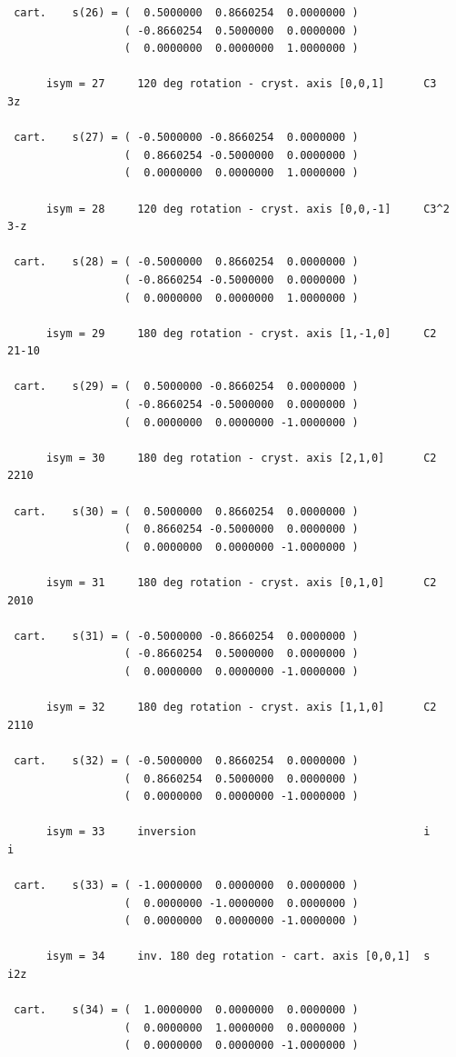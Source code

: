 \documentclass[12pt,a4paper]{article}
\begin{document}
\begin{verbatim}
 cart.    s(26) = (  0.5000000  0.8660254  0.0000000 )
                  ( -0.8660254  0.5000000  0.0000000 )
                  (  0.0000000  0.0000000  1.0000000 )

      isym = 27     120 deg rotation - cryst. axis [0,0,1]      C3     3z

 cart.    s(27) = ( -0.5000000 -0.8660254  0.0000000 )
                  (  0.8660254 -0.5000000  0.0000000 )
                  (  0.0000000  0.0000000  1.0000000 )

      isym = 28     120 deg rotation - cryst. axis [0,0,-1]     C3^2   3-z

 cart.    s(28) = ( -0.5000000  0.8660254  0.0000000 )
                  ( -0.8660254 -0.5000000  0.0000000 )
                  (  0.0000000  0.0000000  1.0000000 )

      isym = 29     180 deg rotation - cryst. axis [1,-1,0]     C2     21-10

 cart.    s(29) = (  0.5000000 -0.8660254  0.0000000 )
                  ( -0.8660254 -0.5000000  0.0000000 )
                  (  0.0000000  0.0000000 -1.0000000 )

      isym = 30     180 deg rotation - cryst. axis [2,1,0]      C2     2210

 cart.    s(30) = (  0.5000000  0.8660254  0.0000000 )
                  (  0.8660254 -0.5000000  0.0000000 )
                  (  0.0000000  0.0000000 -1.0000000 )

      isym = 31     180 deg rotation - cryst. axis [0,1,0]      C2     2010

 cart.    s(31) = ( -0.5000000 -0.8660254  0.0000000 )
                  ( -0.8660254  0.5000000  0.0000000 )
                  (  0.0000000  0.0000000 -1.0000000 )

      isym = 32     180 deg rotation - cryst. axis [1,1,0]      C2     2110

 cart.    s(32) = ( -0.5000000  0.8660254  0.0000000 )
                  (  0.8660254  0.5000000  0.0000000 )
                  (  0.0000000  0.0000000 -1.0000000 )

      isym = 33     inversion                                   i      i

 cart.    s(33) = ( -1.0000000  0.0000000  0.0000000 )
                  (  0.0000000 -1.0000000  0.0000000 )
                  (  0.0000000  0.0000000 -1.0000000 )

      isym = 34     inv. 180 deg rotation - cart. axis [0,0,1]  s      i2z

 cart.    s(34) = (  1.0000000  0.0000000  0.0000000 )
                  (  0.0000000  1.0000000  0.0000000 )
                  (  0.0000000  0.0000000 -1.0000000 )


\end{verbatim}
\end{document}
